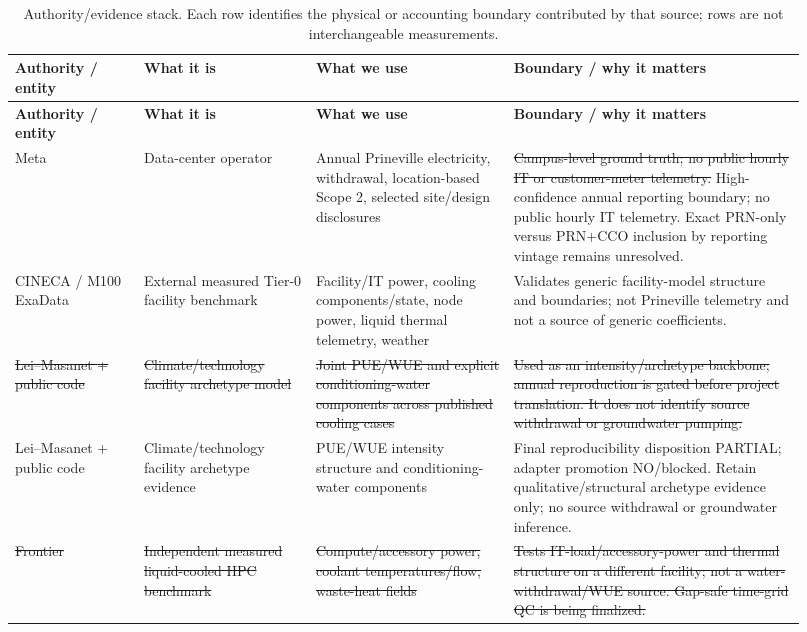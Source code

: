 \documentclass[11pt]{article}
\newcommand{\oldtxt}[1]{\textcolor{blue!70!black}{\sout{#1}}}
\newcommand{\newtxt}[1]{\textcolor{green!45!black}{#1}}
\newcommand{\latesttxt}[1]{\textcolor{purple!85!black}{#1}}
\begin{document}
\begingroup
\small
\begin{longtable}{@{}p{0.15\linewidth}p{0.20\linewidth}p{0.23\linewidth}p{0.34\linewidth}@{}}
\caption{\latesttxt{Authority/evidence stack. Each row identifies the physical or accounting boundary contributed by that source; rows are not interchangeable measurements.}}\\
\toprule
\textbf{Authority / entity} & \textbf{What it is} & \textbf{What we use} & \textbf{Boundary / why it matters} \\
\midrule
\endfirsthead
\toprule
\textbf{Authority / entity} & \textbf{What it is} & \textbf{What we use} & \textbf{Boundary / why it matters} \\
\midrule
\endhead
Meta & Data-center operator & Annual Prineville electricity, withdrawal, location-based Scope 2, selected site/design disclosures & \oldtxt{Campus-level ground truth; no public hourly IT or customer-meter telemetry.} \latesttxt{High-confidence annual reporting boundary; no public hourly IT telemetry. Exact PRN-only versus PRN+CCO inclusion by reporting vintage remains unresolved.} \\
\newtxt{CINECA / M100 ExaData \cite{m100exadata}} & \newtxt{External measured Tier-0 facility benchmark} & \newtxt{Facility/IT power, cooling components/state, node power, liquid thermal telemetry, weather} & \newtxt{Validates generic facility-model structure and boundaries; not Prineville telemetry and not a source of generic coefficients.} \\
\oldtxt{Lei--Masanet \cite{lei2022} + public code} & \oldtxt{Climate/technology facility archetype model} & \oldtxt{Joint PUE/WUE and explicit conditioning-water components across published cooling cases} & \oldtxt{Used as an intensity/archetype backbone; annual reproduction is gated before project translation. It does not identify source withdrawal or groundwater pumping.} \\
\latesttxt{Lei--Masanet \cite{lei2022} + public code} & \latesttxt{Climate/technology facility archetype evidence} & \latesttxt{PUE/WUE intensity structure and conditioning-water components} & \latesttxt{Final reproducibility disposition PARTIAL; adapter promotion NO/blocked. Retain qualitative/structural archetype evidence only; no source withdrawal or groundwater inference.} \\
\oldtxt{Frontier \cite{frontier2024}} & \oldtxt{Independent measured liquid-cooled HPC benchmark} & \oldtxt{Compute/accessory power, coolant temperatures/flow, waste-heat fields} & \oldtxt{Tests IT-load/accessory-power and thermal structure on a different facility; not a water-withdrawal/WUE source. Gap-safe time-grid QC is being finalized.} \\

\end{longtable}
\end{document}
